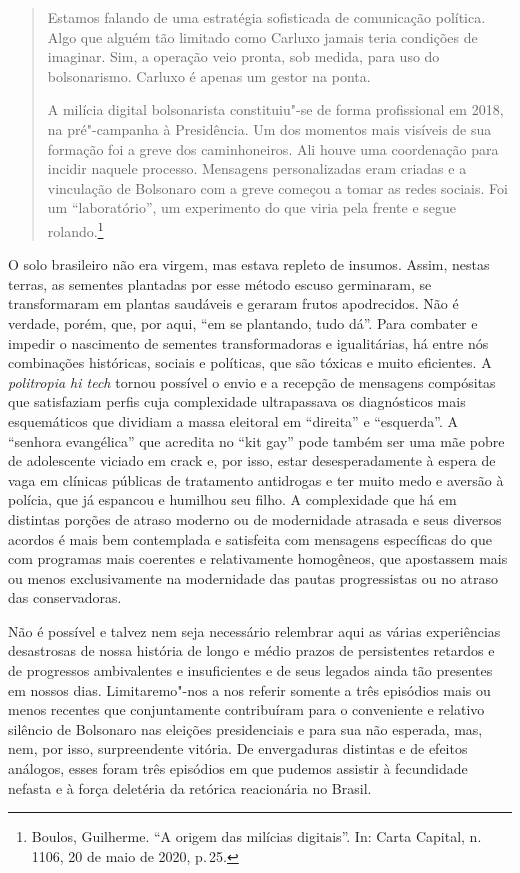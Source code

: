 \begin{quote}
Estamos falando de uma estratégia sofisticada de comunicação política.
Algo que alguém tão limitado como Carluxo jamais teria condições de
imaginar. Sim, a operação veio pronta, sob medida, para uso do
bolsonarismo. Carluxo é apenas um gestor na ponta.

A milícia digital bolsonarista constituiu"-se de forma profissional em
2018, na pré"-campanha à Presidência. Um dos momentos mais visíveis de
sua formação foi a greve dos caminhoneiros. Ali houve uma coordenação
para incidir naquele processo. Mensagens personalizadas eram criadas e a
vinculação de Bolsonaro com a greve começou a tomar as redes sociais.
Foi um ``laboratório'', um experimento do que viria pela frente e segue
rolando.\footnote{Boulos, Guilherme. ``A origem das milícias digitais''.
  In: Carta Capital, n. 1106, 20 de maio de 2020, p.\,25.}
\end{quote}

O solo brasileiro não era virgem, mas estava repleto de insumos. Assim,
nestas terras, as sementes plantadas por esse método escuso germinaram,
se transformaram em plantas saudáveis e geraram frutos apodrecidos. Não
é verdade, porém, que, por aqui, ``em se plantando, tudo dá''. Para
combater e impedir o nascimento de sementes transformadoras e
igualitárias, há entre nós combinações históricas, sociais e políticas,
que são tóxicas e muito eficientes. A \emph{politropia hi tech} tornou
possível o envio e a recepção de mensagens compósitas que satisfaziam
perfis cuja complexidade ultrapassava os diagnósticos mais esquemáticos
que dividiam a massa eleitoral em ``direita'' e ``esquerda''. A
``senhora evangélica'' que acredita no ``kit gay'' pode também ser uma
mãe pobre de adolescente viciado em crack e, por isso, estar
desesperadamente à espera de vaga em clínicas públicas de tratamento
antidrogas e ter muito medo e aversão à polícia, que já espancou e
humilhou seu filho. A complexidade que há em distintas porções de atraso
moderno ou de modernidade atrasada e seus diversos acordos é mais bem
contemplada e satisfeita com mensagens específicas do que com programas
mais coerentes e relativamente homogêneos, que apostassem mais ou menos
exclusivamente na modernidade das pautas progressistas ou no atraso das
conservadoras.

Não é possível e talvez nem seja necessário relembrar aqui as várias
experiências desastrosas de nossa história de longo e médio prazos de
persistentes retardos e de progressos ambivalentes e insuficientes e de
seus legados ainda tão presentes em nossos dias. Limitaremo"-nos a nos
referir somente a três episódios mais ou menos recentes que
conjuntamente contribuíram para o conveniente e relativo silêncio de
Bolsonaro nas eleições presidenciais e para sua não esperada, mas, nem,
por isso, surpreendente vitória. De envergaduras distintas e de efeitos
análogos, esses foram três episódios em que pudemos assistir à
fecundidade nefasta e à força deletéria da retórica reacionária no
Brasil.

